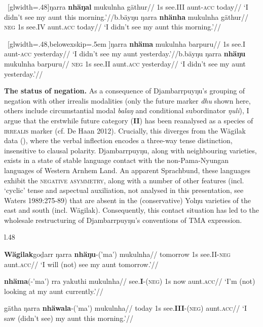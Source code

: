 \documentclass[dvipsnames,12pt]{article}%
\begin{document}
\pex~[glwidth=.48\textwidth  ]\a\begingl\gla  ŋarra \textbf{nhäŋal} mukulnha gäthur//
\glb 1s see.\gls{III} aunt-\textsc{acc} today//
\glft`I didn't see my aunt this morning.'//\endgl b.\hspace{.3em}\begingl\gla bäyŋu ŋarra \textbf{nhänha} mukulnha gäthur//
\glb \textsc{neg} 1s see.\gls{IV} aunt.\textsc{acc} today//
\glft`I didn't see my aunt this morning.'//\endgl\xe

		
\pex~[glwidth=.48\textwidth,belowexskip=.5em  ]\a\begingl\gla ŋarra \textbf{nhäma} mukulnha barpuru//
\glb 1s see.\gls{I} aunt-\textsc{acc} yesterday//
\glft`I didn't see my aunt yesterday.'//\endgl b.\hspace{.3em}\begingl\gla bäyŋu ŋarra \textbf{nhäŋu} mukulnha barpuru//
\glb \textsc{neg} 1s see.\gls{II} aunt.\textsc{acc} yesterday//
\glft`I didn't see my aunt yesterday.'//\endgl\xe

\noindent\textbf{The status of negation.} As a consequence of Djambarrpuyŋu's grouping of negation with other irrealis modalities (only the future marker \textit{dhu} shown here, others include circumstantial modal \textit{balaŋ} and conditional subordinator \textit{ŋuli}), I argue that the erstwhile future category (\textbf{II}) has been reanalysed as a species of \textsc{irrealis} marker (cf. De Haan 2012). Crucially, this diverges from the Wägilak data (), where the verbal inflection encodes a three-way tense distinction, insensitive to clausal polarity. Djambarrpuyŋu, along with neighbouring varieties, exists in a state of stable language contact with the non-Pama-Nyungan languages of Western Arnhem Land. An apparent Sprachbund, these languages exhibit the \textsc{negative asymmetry}, along with a number of other features (incl. `cyclic' tense and aspectual auxiliation, not analysed in this presentation, see Waters 1989:275-89) that are absent in the (conservative) Yolŋu varieties of the east and south (incl. Wägilak). Consequently, this contact situation has led to the wholesale restructuring of Djambarrpuyŋu's conventions of TMA expression.

\vspace{-1em}
\begin{wrapfigure}{l}{.48\linewidth}
\begin{minipage}{\linewidth}\vspace{-1em}
\pex[numoffset=-.8em,labeloffset=-.7em]\textbf{Wägilak}\a\begingl\gla goḏarr ŋarra \textbf{nhäŋu}-('ma') mukulnha//
\glb tomorrow 1s see.\textsc{\gls{II}}-\textsc{neg} aunt.\textsc{acc}//
\glft`I will (not) see my aunt tomorrow.'//\endgl

\a\begingl\gla \textbf{nhäma}(-'ma') rra yakuthi mukulnha//
\glb see.\textbf{\gls{I}}-(\textsc{neg}) 1s now aunt.\textsc{acc}//
\glft`I'm (not) looking at my aunt currently.'//\endgl

\a\begingl\gla gätha ŋarra \textbf{nhäwala}-('ma') mukulnha//
\glb today 1s see.\textbf{\gls{III}}-(\textsc{neg}) aunt.\textsc{acc}//
\glft`I saw (didn't see) my aunt this morning.'//\endgl
\xe\end{minipage}\end{wrapfigure}
\end{document}
